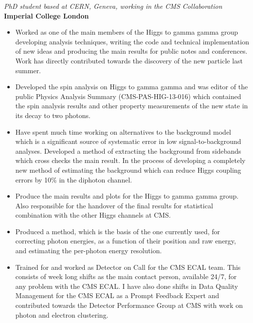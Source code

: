 \documentclass[margin, 10pt]{res} %
\begin{document}
\begin{resume}
{\sl PhD student based at CERN, Geneva, working in the CMS Collaboration}\\%
{\bf Imperial College London}
\begin{itemize} \itemsep -2pt %
\item Worked as one of the main members of the Higgs to gamma gamma group developing analysis techniques, writing the 
code and technical implementation of new ideas and producing the main results for public notes and conferences. 
Work has directly contributed towards the discovery of the new particle last summer.
\item Developed the spin analysis on Higgs to gamma gamma and was editor of the public Physics Analysis Summary (CMS-PAS-HIG-13-016) which contained the spin analysis results and other property measurements of the new state in its decay to two photons.
\item Have spent much time working on alternatives to the background model which is a significant source of systematic error in low signal-to-background analyses. Developed a method of extracting the background from sidebands which cross checks the main result. In the process of developing a completely new method of estimating the background which can reduce Higgs coupling errors by 10\% in the diphoton channel. 
\item Produce the main results and plots for the Higgs to gamma gamma group. Also responsible for the handover of
the final results for statistical combination with the other Higgs channels at CMS.
\item Produced a method, which is the basis of the one currently used, for correcting photon energies, as a function of their position and raw energy, and estimating the per-photon energy resolution.
\item Trained for and worked as Detector on Call for the CMS ECAL team. This consists of week long shifts as the main contact person, available 24/7, for any problem with the CMS ECAL. I have also done shifts in Data Quality Management for the CMS ECAL as a Prompt Feedback Expert and contributed towards the Detector Performance Group at CMS with work on photon and electron clustering.
\end{itemize}


\end{resume}
\end{document}
